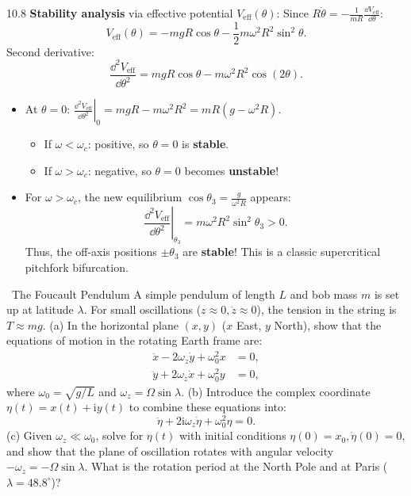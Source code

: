 \begin{solution}{10.8}
\textbf{Stability analysis} via effective potential $V_{\text{eff}}(\theta)$:
Since $R\ddot{\theta} = -\frac{1}{mR}\frac{\dd V_{\text{eff}}}{\dd\theta}$:
\[
V_{\text{eff}}(\theta) = -mgR\cos\theta - \frac{1}{2}m\omega^2 R^2\sin^2\theta.
\]
Second derivative:
\[
\frac{\dd^2 V_{\text{eff}}}{\dd\theta^2} = mgR\cos\theta - m\omega^2 R^2\cos(2\theta).
\]
\begin{itemize}[leftmargin=1.4em,itemsep=2pt]
  \item At $\theta = 0$: $\left.\frac{\dd^2 V_{\text{eff}}}{\dd\theta^2}\right|_0 = mgR - m\omega^2 R^2 = mR(g - \omega^2 R)$.
  \begin{itemize}
    \item If $\omega < \omega_c$: positive, so $\theta = 0$ is \textbf{stable}.
    \item If $\omega > \omega_c$: negative, so $\theta = 0$ becomes \textbf{unstable}!
  \end{itemize}
  \item For $\omega > \omega_c$, the new equilibrium $\cos\theta_3 = \frac{g}{\omega^2 R}$ appears:
  \[
  \left.\frac{\dd^2 V_{\text{eff}}}{\dd\theta^2}\right|_{\theta_3} = m\omega^2 R^2\sin^2\theta_3 > 0.
  \]
  Thus, the off-axis positions $\pm\theta_3$ are \textbf{stable}! This is a classic supercritical pitchfork bifurcation.
\end{itemize}
\end{solution}

\begin{exercise}{\mastery\ The Foucault Pendulum}
A simple pendulum of length $L$ and bob mass $m$ is set up at latitude $\lambda$. For small oscillations ($z \approx 0, \dot{z} \approx 0$), the tension in the string is $T \approx mg$.
(a) In the horizontal plane $(x, y)$ ($x$ East, $y$ North), show that the equations of motion in the rotating Earth frame are:
\begin{align*}
\ddot{x} - 2\omega_z\dot{y} + \omega_0^2 x &= 0, \\
\ddot{y} + 2\omega_z\dot{x} + \omega_0^2 y &= 0,
\end{align*}
where $\omega_0 = \sqrt{g/L}$ and $\omega_z = \Omega\sin\lambda$.
(b) Introduce the complex coordinate $\eta(t) = x(t) + \mathrm{i}y(t)$ to combine these equations into:
\[
\ddot{\eta} + 2\mathrm{i}\omega_z\dot{\eta} + \omega_0^2\eta = 0.
\]
(c) Given $\omega_z \ll \omega_0$, solve for $\eta(t)$ with initial conditions $\eta(0) = x_0, \dot{\eta}(0) = 0$, and show that the plane of oscillation rotates with angular velocity $-\omega_z = -\Omega\sin\lambda$. What is the rotation period at the North Pole and at Paris ($\lambda = 48.8^\circ$)?
\end{exercise}


